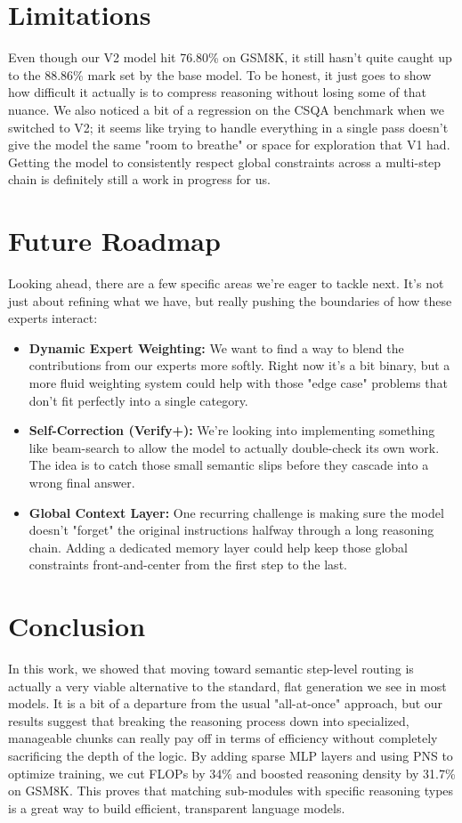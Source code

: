 \documentclass[conference,compsoc]{IEEEtran}
\begin{document}
\section{Limitations}
Even though our V2 model hit 76.80\% on GSM8K, it still hasn't quite caught up to the 88.86\% mark set by the base model. To be honest, it just goes to show how difficult it actually is to compress reasoning without losing some of that nuance. We also noticed a bit of a regression on the CSQA benchmark when we switched to V2; it seems like trying to handle everything in a single pass doesn't give the model the same "room to breathe" or space for exploration that V1 had. Getting the model to consistently respect global constraints across a multi-step chain is definitely still a work in progress for us.

\section{Future Roadmap}
Looking ahead, there are a few specific areas we’re eager to tackle next. It’s not just about refining what we have, but really pushing the boundaries of how these experts interact:
\begin{itemize}
    \item \textbf{Dynamic Expert Weighting:} We want to find a way to blend the contributions from our experts more softly. Right now it’s a bit binary, but a more fluid weighting system could help with those "edge case" problems that don't fit perfectly into a single category.
    \item \textbf{Self-Correction (Verify+):} We’re looking into implementing something like beam-search to allow the model to actually double-check its own work. The idea is to catch those small semantic slips before they cascade into a wrong final answer.
    \item \textbf{Global Context Layer:} One recurring challenge is making sure the model doesn't "forget" the original instructions halfway through a long reasoning chain. Adding a dedicated memory layer could help keep those global constraints front-and-center from the first step to the last.
\end{itemize}

\section{Conclusion}
In this work, we showed that moving toward semantic step-level routing is actually a very viable alternative to the standard, flat generation we see in most models. It is a bit of a departure from the usual "all-at-once" approach, but our results suggest that breaking the reasoning process down into specialized, manageable chunks can really pay off in terms of efficiency without completely sacrificing the depth of the logic. By adding sparse MLP layers and using PNS to optimize training, we cut FLOPs by 34\% and boosted reasoning density by 31.7\% on GSM8K. This proves that matching sub-modules with specific reasoning types is a great way to build efficient, transparent language models.
\end{document}

